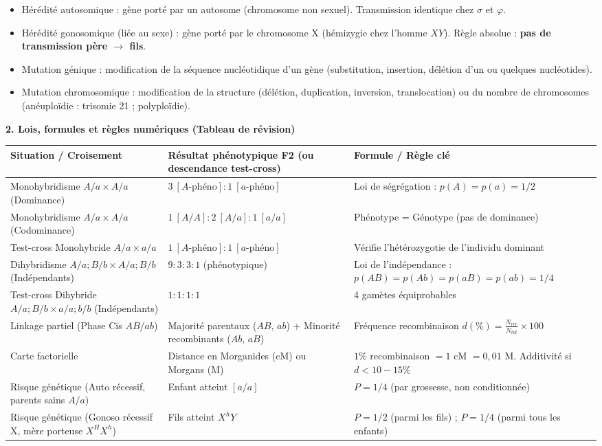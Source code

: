 \documentclass[11pt]{article}
\newcommand{\cle}[1]{{\popxbold\color{popdark}#1}}
\begin{document}
\begin{aretenir}
\begin{itemize}
    \item \cle{Hérédité autosomique} : gène porté par un autosome (chromosome non sexuel). Transmission identique chez $\sigma$ et $\varphi$.
    \item \cle{Hérédité gonosomique (liée au sexe)} : gène porté par le chromosome X (hémizygie chez l'homme $XY$). Règle absolue : \textbf{pas de transmission père $\rightarrow$ fils}.
    \item \cle{Mutation génique} : modification de la séquence nucléotidique d'un gène (substitution, insertion, délétion d'un ou quelques nucléotides).
    \item \cle{Mutation chromosomique} : modification de la structure (délétion, duplication, inversion, translocation) ou du nombre de chromosomes (anéuploïdie : trisomie 21 ; polyploïdie).
\end{itemize}

\textbf{2. Lois, formules et règles numériques (Tableau de révision)}
\begin{center}
\begin{tabularx}{\linewidth}{|l|X|X|}\hline
\rowcolor{popblueL}
\textbf{Situation / Croisement} & \textbf{Résultat phénotypique F2 (ou descendance test-cross)} & \textbf{Formule / Règle clé} \\ \hline
Monohybridisme $A/a \times A/a$ (Dominance) & $3\ [A\text{-phéno}] : 1\ [a\text{-phéno}]$ & Loi de ségrégation : $p(A)=p(a)=1/2$ \\ \hline
Monohybridisme $A/a \times A/a$ (Codominance) & $1\ [A/A] : 2\ [A/a] : 1\ [a/a]$ & Phénotype = Génotype (pas de dominance) \\ \hline
Test-cross Monohybride $A/a \times a/a$ & $1\ [A\text{-phéno}] : 1\ [a\text{-phéno}]$ & Vérifie l'hétérozygotie de l'individu dominant \\ \hline
Dihybridisme $A/a; B/b \times A/a; B/b$ (Indépendants) & $9:3:3:1$ (phénotypique) & Loi de l'indépendance : $p(AB)=p(Ab)=p(aB)=p(ab)=1/4$ \\ \hline
Test-cross Dihybride $A/a; B/b \times a/a; b/b$ (Indépendants) & $1:1:1:1$ & 4 gamètes équiprobables \\ \hline
Linkage partiel (Phase Cis $AB/ab$) & Majorité parentaux ($AB$, $ab$) + Minorité recombinants ($Ab$, $aB$) & Fréquence recombinaison $d(\%) = \frac{N_{rec}}{N_{tot}} \times 100$ \\ \hline
Carte factorielle & Distance en \cle{Morganides (cM)} ou \cle{Morgans (M)} & $1\%$ recombinaison $= 1$ cM $= 0,01$ M. Additivité si $d < 10-15\%$ \\ \hline
Risque génétique (Auto récessif, parents sains $A/a$) & Enfant atteint $[a/a]$ & $P = 1/4$ (par grossesse, non conditionnée) \\ \hline
Risque génétique (Gonoso récessif X, mère porteuse $X^{H}X^{h}$) & Fils atteint $X^{h}Y$ & $P = 1/2$ (parmi les fils) ; $P = 1/4$ (parmi tous les enfants) \\ \hline
\end{tabularx}
\end{center}

\end{aretenir}
\end{document}
